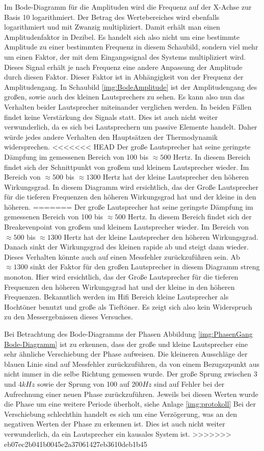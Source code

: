 Im Bode-Diagramm für die Amplituden wird die Frequenz auf der X-Achse zur Basis 10 logarithmiert. Der Betrag des Wertebereiches wird ebenfalls logarithmiert und mit Zwanzig multipliziert. Damit erhält man einen Amplitudenfaktor in Dezibel. Es handelt sich also nicht um eine bestimmte Amplitude zu einer bestimmten Frequenz in diesem Schaubild, sondern viel mehr um einen Faktor, der mit dem Eingangssignal des Systems multipliziert wird. Dieses Signal erhält je nach Frequenz eine andere Anpassung der Amplitude durch diesen Faktor. Dieser Faktor ist in Abhängigkeit von der Frequenz der Amplitudengang.
In Schaubild \ref{img:BodeAmplitude} ist der Amplitudengang des großen, sowie auch des kleinen Lautsprechers zu sehen.
Es kann also nun das Verhalten beider Lautsprecher miteinander verglichen werden. In beiden Fällen findet keine Verstärkung des Signals statt. Dies ist auch nicht weiter verwunderlich, da es sich bei Lautsprechern um passive Elemente handelt. Daher würde jedes andere Verhalten den Hauptsätzen der Thermodynamik widersprechen.
<<<<<<< HEAD
Der große Lautsprecher hat seine geringste Dämpfung im gemessenen Bereich von 100 bis $\approx 500$ Hertz. In diesem Bereich findet sich der Schnittpunkt von großem und kleinem Lautsprecher wieder. Im Bereich von $\approx 500$ bis $\approx 1300$ Hertz hat der kleine Lautsprecher den höheren Wirkungsgrad. In diesem Diagramm wird ersichtlich, das der Große Lautsprecher für die tieferen Frequenzen den höheren Wirkungsgrad hat und der kleine in den höheren.
=======
Der große Lautsprecher hat seine geringste Dämpfung im gemessenen Bereich von 100 bis $\approx500$ Hertz. In diesem Bereich findet sich der Breakevenpoint von großem und kleinem Lautsprecher wieder. Im Bereich von $\approx500$ bis $\approx1300$ Hertz hat der kleine Lautsprecher den höheren Wirkungsgrad. Danach sinkt der Wirkungsgrad des kleinen rapide ab und steigt dann wieder. Dieses Verhalten könnte auch auf einen Messfehler zurückzuführen sein. Ab $\approx1300$ sinkt der Faktor für den großen Lautsprecher in diesem Diagramm streng monoton. Hier wird ersichtlich, das der Große Lautsprecher für die tieferen Frequenzen den höheren Wirkungsgrad hat und der kleine in den höheren Frequenzen. Bekanntlich werden im Hifi Bereich kleine Lautsprecher als Hochtöner benutzt und große  als Tieftöner. Es zeigt sich also kein Widerspruch zu den Messergebnissen dieses Versuches.

Bei Betrachtung des Bode-Diagramms der Phasen Abbildung \ref{img:PhasenGang Bode-Diagramm} ist zu erkennen, dass der große und kleine Lautsprecher eine sehr ähnliche Verschiebung der Phase aufweisen.
Die kleineren Ausschläge der blauen Linie sind auf Messfehler zurückzuführen, da von einem Bezugszpunkt aus nicht immer in die selbe Richtung gemessen wurde. Der große Sprung zwischen 3 und 4$kHz$ sowie der Sprung von 100 auf 200$Hz$ sind auf Fehler bei der Aufrechnung einer neuen Phase zurückzuführen. Jeweils bei diesen Werten wurde die Phase um eine weitere Periode überholt, siehe Anlage \ref{img:protokoll} Bei der Verschiebung schlechthin handelt es sich um eine Verzögerung, was an den negativen Werten der Phase zu erkennen ist. Dies ist auch nicht weiter verwunderlich, da ein Lautsprecher ein kausales System ist.
>>>>>>> eb07ec2b041b0045e2a37061427eb3610deb1b45


